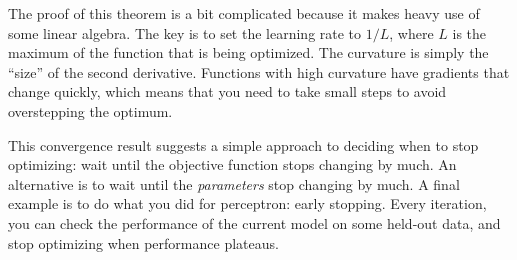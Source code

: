 
The proof of this theorem is a bit complicated because it makes heavy
use of some linear algebra.  The key is to set the learning rate to
$1/L$, where $L$ is the maximum  of the function
that is being optimized.  The curvature is simply the ``size'' of the
second derivative.  Functions with high curvature have gradients that
change quickly, which means that you need to take small steps to avoid
overstepping the optimum.

\begin{comment}
Fortunately, we can prove a simpler version of this theorem for
one-dimensional functions.  We do this just to give a sense of how
convergence proofs go.  In the single dimensional case, we will call
the algorithm ``derivative descent.''  To set up some notation, let
$f(z)$ be the function to be minimized by derivative descent.  Let
$z_0$ be the initial value and $z^*$ be the optimum.  Let $f'(z)$ be
the first derivative of $f$ and let $f''$ be the second derivative.
Let $L$ be large enough that $f''(z) < L$ for all $z$.

\begin{theorem}[Derivative Descent Convergence] \label{thm:loss:dd}
  For constant $\eta = 1/L$, derivative descent will converge at a
  rate of $f(z\kth) - f(z^*) \leq \frac {2 (z\zth-z^*)^2} {\eta(k+1)}$.
\end{theorem}

\begin{myproof}{\ref{thm:loss:dd}}
  We use Taylor's theorem to expand $f(z)$:
  \begin{align}
    f(z)
      &= f(a)
       + f'(a) (z-a)
       + \frac 1 2 f''(a) (z-a)^2
       + \dots \\
      &\leq f(a)
       + f'(a) (z-a)
       + \frac 1 2 f''(a) (z-a)^2
  \end{align}
  The ``\dots'' is guaranteed to be non-negative because $f$ is
  convex.
\end{myproof}
\end{comment}

This convergence result suggests a simple approach to deciding when to
stop optimizing: wait until the objective function stops changing by
much.  An alternative is to wait until the \emph{parameters} stop
changing by much.  A final example is to do what you did for
perceptron: early stopping.  Every iteration, you can check the
performance of the current model on some held-out data, and stop
optimizing when performance plateaus.


